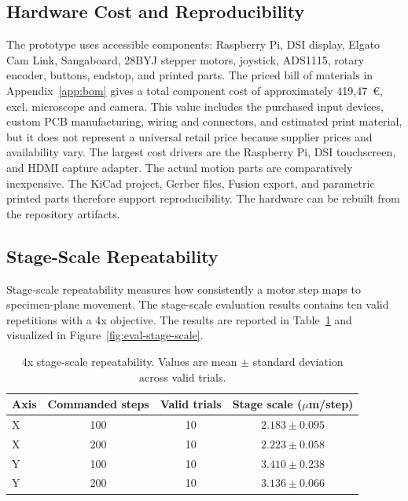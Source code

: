 \subsection{Hardware Cost and Reproducibility}

The prototype uses accessible components: Raspberry Pi, DSI display, Elgato Cam Link, Sangaboard, 28BYJ stepper motors, joystick, ADS1115, rotary encoder, buttons, endstop, and printed parts. The priced bill of materials in Appendix~\ref{app:bom} gives a total component cost of approximately 419,47~\euro, excl. microscope and camera. This value includes the purchased input devices, custom PCB manufacturing, wiring and connectors, and estimated print material, but it does not represent a universal retail price because supplier prices and availability vary. The largest cost drivers are the Raspberry Pi, DSI touchscreen, and HDMI capture adapter. The actual motion parts are comparatively inexpensive. The KiCad project, Gerber files, Fusion export, and parametric printed parts therefore support reproducibility. The hardware can be rebuilt from the repository artifacts.

\subsection{Stage-Scale Repeatability}

Stage-scale repeatability measures how consistently a motor step maps to specimen-plane movement.
The stage-scale evaluation results contains ten valid repetitions with a 4x objective. The results are reported
in Table~\ref{tab:stagescale} and visualized in Figure~\ref{fig:eval-stage-scale}.



\begin{table}[H]
    \centering
    \caption[4x stage-scale repeatability]{4x stage-scale repeatability. Values are mean $\pm$ standard deviation across valid
    trials.}
    \label{tab:stagescale}
    \begin{tabular}{@{}l c c c@{}}
        \toprule
        \textbf{Axis} & \textbf{Commanded steps} & \textbf{Valid trials} &
        \textbf{Stage scale ($\mu$m/step)} \\
        \midrule
        X & 100 & 10 & $2.183 \pm 0.095$ \\
        X & 200 & 10 & $2.223 \pm 0.058$ \\
        Y & 100 & 10 & $3.410 \pm 0.238$ \\
        Y & 200 & 10 & $3.136 \pm 0.066$ \\
        \bottomrule
    \end{tabular}
\end{table}

